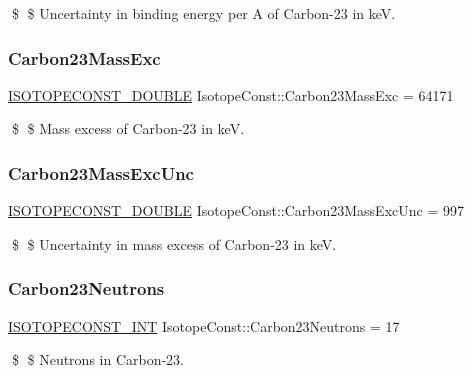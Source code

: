 \$ \$ Uncertainty in binding energy per A of Carbon-\/23 in keV. \mbox{\label{group___isotope_const-_carbon-_c23_ga3a51a7867fb856ad0fcd23469065ffde}} 
\subsubsection{\texorpdfstring{Carbon23\+Mass\+Exc}{Carbon23MassExc}}
{\footnotesize\ttfamily \mbox{\hyperlink{group___isotope_const-_macros_ga8f45a7272ce02c0b4c65c44636ed719a}{I\+S\+O\+T\+O\+P\+E\+C\+O\+N\+S\+T\+\_\+\+D\+O\+U\+B\+LE}} Isotope\+Const\+::\+Carbon23\+Mass\+Exc = 64171}

\$ \$ Mass excess of Carbon-\/23 in keV. \mbox{\label{group___isotope_const-_carbon-_c23_gabe0d1f480d6ec844545aaecd362c131b}} 
\subsubsection{\texorpdfstring{Carbon23\+Mass\+Exc\+Unc}{Carbon23MassExcUnc}}
{\footnotesize\ttfamily \mbox{\hyperlink{group___isotope_const-_macros_ga8f45a7272ce02c0b4c65c44636ed719a}{I\+S\+O\+T\+O\+P\+E\+C\+O\+N\+S\+T\+\_\+\+D\+O\+U\+B\+LE}} Isotope\+Const\+::\+Carbon23\+Mass\+Exc\+Unc = 997}

\$ \$ Uncertainty in mass excess of Carbon-\/23 in keV. \mbox{\label{group___isotope_const-_carbon-_c23_ga47173b3089c2016d742ecaafa400ca1e}} 
\subsubsection{\texorpdfstring{Carbon23\+Neutrons}{Carbon23Neutrons}}
{\footnotesize\ttfamily \mbox{\hyperlink{group___isotope_const-_macros_ga5f18360b3e99483a35c32d789e62621c}{I\+S\+O\+T\+O\+P\+E\+C\+O\+N\+S\+T\+\_\+\+I\+NT}} Isotope\+Const\+::\+Carbon23\+Neutrons = 17}

\$ \$ Neutrons in Carbon-\/23. \mbox{\label{group___isotope_const-_carbon-_c23_ga1ca86a9257cd7dc3131c94704269faac}} 
